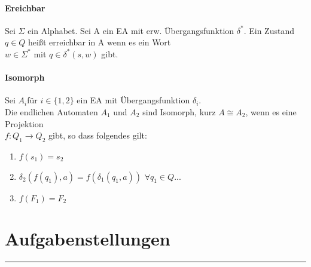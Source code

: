\documentclass[DIV=15]{scrartcl}
\begin{document}
    \subsection{Ereichbar}
        Sei \(\Sigma\) ein Alphabet. Sei A ein EA mit erw. Übergangsfunktion \(\delta^*\). 
        Ein Zustand \(q\in Q\) heißt erreichbar in A wenn es ein Wort \\
        \(w\in\Sigma^*\) mit \(q\in\delta^*(s,w)\) gibt.
    \subsection{Isomorph}
        Sei \(A_i\)für \(i\in\{1,2\}\) ein EA mit Übergangsfunktion \(\delta_i\).\\
        Die endlichen Automaten \(A_1\) und \(A_2\) sind Isomorph, kurz \(A\cong A_2 \), wenn es eine Projektion \\ \(f:Q_1\to Q_2\) gibt, so dass folgendes gilt:
        \begin{enumerate}
            \item \(f(s_1)=s_2\)
            \item \(\delta_2(f(q_1),a)=f(\delta_1(q_1,a))\) \(\forall q_1\in Q... \)
            \item \(f(F_1)=F_2\)
        \end{enumerate}

\newpage
\part{Aufgabenstellungen}
\rule{467.1pt}{0.4pt}
\end{document}
